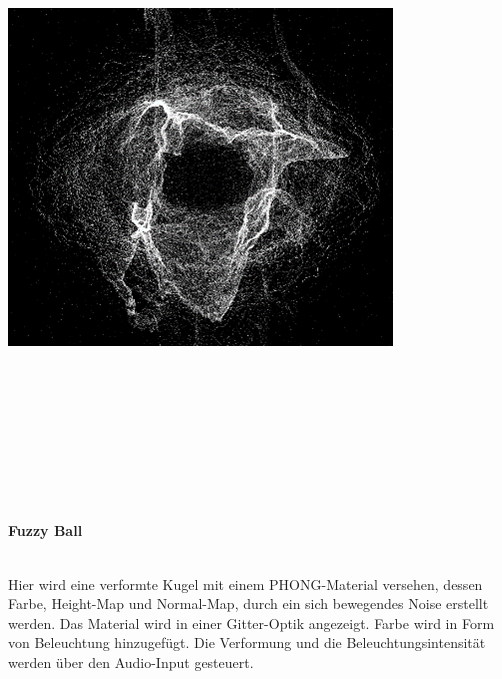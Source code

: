 \documentclass[12pt]{scrartcl}%
\theoremstyle{nonumberplain}
\begin{document}
\hspace{20pt}
\begin{minipage}{0.5\textwidth}
  \centering
  \includegraphics[width=\textwidth]{td_3}
\end{minipage}
\\\\
\\\\
\\\\
\\\\
\textbf{Fuzzy Ball}\\\\
\begin{minipage}{0.4\textwidth}
Hier wird eine verformte Kugel mit einem PHONG-Material versehen, dessen Farbe, Height-Map und Normal-Map, durch ein sich bewegendes Noise erstellt werden. Das Material wird in einer Gitter-Optik angezeigt. Farbe wird in Form von Beleuchtung hinzugefügt. Die Verformung und die Beleuchtungsintensität werden über den Audio-Input gesteuert.
\vspace{90pt}
\end{minipage}
\hspace{20pt}
\end{document}
